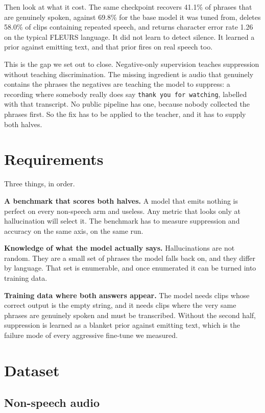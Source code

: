 \documentclass[preprint]{article}
\begin{document}
Then look at what it cost. The same checkpoint recovers 41.1\% of phrases that are genuinely
spoken, against 69.8\% for the base model it was tuned from, deletes
58.0\% of clips containing repeated speech, and returns character error rate 1.26 on the typical
FLEURS language. It did not learn to detect silence. It learned a prior against emitting text,
and that prior fires on real speech too.

This is the gap we set out to close. Negative-only supervision teaches suppression without
teaching discrimination. The missing ingredient is audio that genuinely contains the phrases the
negatives are teaching the model to suppress: a recording where somebody really does say
\texttt{thank you for watching}, labelled with that transcript. No public pipeline has one,
because nobody collected the phrases first. So the fix has to be applied to the teacher, and it
has to supply both halves.

\section{Requirements}

Three things, in order.

\textbf{A benchmark that scores both halves.} A model that emits nothing is perfect on every
non-speech arm and useless. Any metric that looks only at hallucination will select it. The
benchmark has to measure suppression and accuracy on the same axis, on the same run.

\textbf{Knowledge of what the model actually says.} Hallucinations are not random. They are a
small set of phrases the model falls back on, and they differ by language. That set is
enumerable, and once enumerated it can be turned into training data.

\textbf{Training data where both answers appear.} The model needs clips whose correct output is
the empty string, and it needs clips where the very same phrases are genuinely spoken and must
be transcribed. Without the second half, suppression is learned as a blanket prior against
emitting text, which is the failure mode of every aggressive fine-tune we measured.

\section{Dataset}

\subsection{Non-speech audio}
\end{document}
